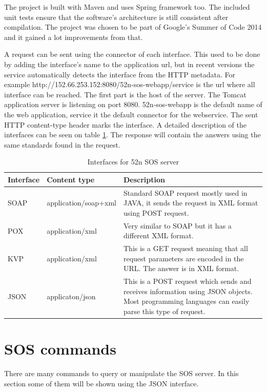 The project is built with Maven and uses Spring framework too. The included unit tests ensure that the software's architecture is still consistent after compilation. The project was chosen to be part of Google's Summer of Code 2014 and it gained a lot improvements from that. 

A request can be sent using the connector of each interface. This used to be done by adding the interface's name to the application url, but in recent versions the service automatically detects the interface from the HTTP metadata. For example http://152.66.253.152:8080/52n-sos-webapp/service is the url where all interface can be reached. The first part is the host of the server. The Tomcat application server is listening on port 8080. 52n-sos-webapp is the default name of the web application, service it the default connector for the webservice. The sent HTTP content-type header marks the interface. A detailed description of the interfaces can be seen on table \ref{tab:services}. The response will contain the answers using the same standards found in the request.
\begin{table}[h]
\begin{center}
\begin{tabular}{| l | l | p{8cm} |}
\hline
Interface  & Content type & Description \\ \hline \hline
SOAP & application/soap+xml & Standard SOAP request mostly used in JAVA, it sends the request in XML format using POST request. \\ \hline
POX & application/xml & Very similar to SOAP but it has a different XML format. \\ \hline
KVP & application/xml & This is a GET request meaning that all request parameters are encoded in the URL. The answer is in XML format. \\ \hline
JSON & applicaton/json & This is a POST request which sends and receives information using JSON objects. Most programming languages can easily parse this type of request.\\ \hline
\end{tabular}
\caption{Interfaces for 52n SOS server\label{tab:services}}
\end{center}
\end{table}


\section{SOS commands}
There are many commands to query or manipulate the SOS server. In this section some of them will be shown using the JSON interface. 


